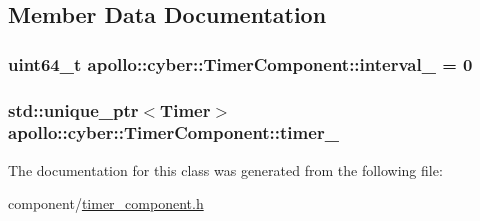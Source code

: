 \subsection{Member Data Documentation}
\hypertarget{classapollo_1_1cyber_1_1TimerComponent_afd2a48b4341f6e46bfe4e260d6b78f87}{
\subsubsection[{interval\-\_\-}]{\setlength{\rightskip}{0pt plus 5cm}uint64\-\_\-t apollo\-::cyber\-::\-Timer\-Component\-::interval\-\_\- = 0\hspace{0.3cm}{\ttfamily [private]}}}\label{classapollo_1_1cyber_1_1TimerComponent_afd2a48b4341f6e46bfe4e260d6b78f87}
\hypertarget{classapollo_1_1cyber_1_1TimerComponent_a3638c28835da079e3e9071508e94048e}{
\subsubsection[{timer\-\_\-}]{\setlength{\rightskip}{0pt plus 5cm}std\-::unique\-\_\-ptr$<${\bf Timer}$>$ apollo\-::cyber\-::\-Timer\-Component\-::timer\-\_\-\hspace{0.3cm}{\ttfamily [private]}}}\label{classapollo_1_1cyber_1_1TimerComponent_a3638c28835da079e3e9071508e94048e}


The documentation for this class was generated from the following file\-:\begin{DoxyCompactItemize}
\item 
component/\hyperlink{timer__component_8h}{timer\-\_\-component.\-h}\end{DoxyCompactItemize}
